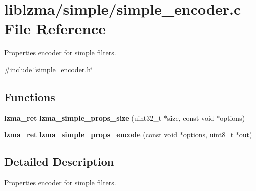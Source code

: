 \section{liblzma/simple/simple\+\_\+encoder.c File Reference}
\label{simple__encoder_8c}


Properties encoder for simple filters.  


{\ttfamily \#include \char`\"{}simple\+\_\+encoder.\+h\char`\"{}}\newline
\subsection*{Functions}
\begin{DoxyCompactItemize}
\item 
\mbox{\label{simple__encoder_8c_ae38a631eb233ba04674f36ec11884089}} 
\textbf{ lzma\+\_\+ret} {\bfseries lzma\+\_\+simple\+\_\+props\+\_\+size} (uint32\+\_\+t $\ast$size, const void $\ast$options)
\item 
\mbox{\label{simple__encoder_8c_ad3c030fa9638c5f043c3e1d20de380ac}} 
\textbf{ lzma\+\_\+ret} {\bfseries lzma\+\_\+simple\+\_\+props\+\_\+encode} (const void $\ast$options, uint8\+\_\+t $\ast$out)
\end{DoxyCompactItemize}


\subsection{Detailed Description}
Properties encoder for simple filters. 

